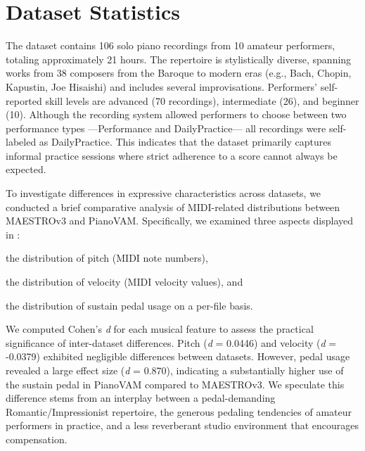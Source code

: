 \documentclass{article}
\begin{document}
\section{Dataset Statistics}\label{sec:dataset-statistics}

The dataset contains 106 solo piano recordings from 10 amateur performers, totaling approximately 21 hours. The repertoire is stylistically diverse, spanning works from 38 composers from the Baroque to modern eras (e.g., Bach, Chopin, Kapustin, Joe Hisaishi) and includes several improvisations. Performers' self-reported skill levels are advanced (70 recordings), intermediate (26), and beginner (10). Although the recording system allowed performers to choose between two performance types ---Performance and DailyPractice--- all recordings were self-labeled as DailyPractice. This indicates that the dataset primarily captures informal practice sessions where strict adherence to a score cannot always be expected. %

To investigate differences in expressive characteristics across datasets, we conducted a brief comparative analysis of MIDI-related distributions between MAESTROv3 and PianoVAM. Specifically, we examined three aspects displayed in : 
\begin{inparaenum}[(i)]
    \item the distribution of pitch (MIDI note numbers), 
    \item the distribution of velocity (MIDI velocity values), and 
    \item the distribution of sustain pedal usage on a per-file basis.
\end{inparaenum}
We computed Cohen's \textit{d} for each musical feature to assess the practical significance of inter-dataset differences.  Pitch (\textit{d} = 0.0446) and velocity (\textit{d} = -0.0379) exhibited negligible differences between datasets. However, pedal usage revealed a large effect size (\textit{d} = 0.870), indicating a substantially higher use of the sustain pedal in PianoVAM compared to MAESTROv3. We speculate this difference stems from an interplay between a pedal-demanding Romantic/Impressionist repertoire, the generous pedaling tendencies of amateur performers in practice, and a less reverberant studio environment that encourages compensation. %
 
\end{document}
